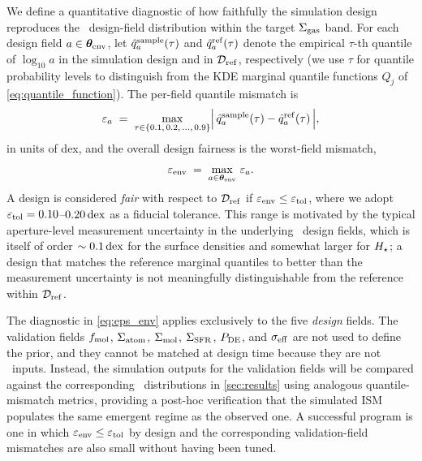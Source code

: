 We define a quantitative diagnostic of how faithfully the simulation
design reproduces the \PHANGS\ design-field distribution within the
target $\Sigma_{\rm gas}$ band. For each design field $a \in \boldsymbol{\theta}_{\rm env}$, let
$\hat{q}^{\rm sample}_{a}(\tau)$ and $\hat{q}^{\rm ref}_{a}(\tau)$
denote the empirical $\tau$-th quantile of $\log_{10} a$ in the
simulation design and in $\mathcal{D}_{\rm ref}$, respectively (we use $\tau$ for
quantile probability levels to distinguish from the KDE marginal
quantile functions $Q_j$ of \autoref{eq:quantile_function}).
The per-field quantile mismatch is
\begin{equation}
\varepsilon_a \;=\;
\max_{\tau \in \left\{{0.1,\,0.2,\,\ldots,\,0.9}\right\}}
\Bigl|\,\hat{q}^{\rm sample}_{a}(\tau)
- \hat{q}^{\rm ref}_{a}(\tau)\,\Bigr|,
\label{eq:eps_a}
\end{equation}
in units of dex, and the overall design fairness is the worst-field
mismatch,
\begin{equation}
\varepsilon_{\rm env} \;=\;
\max_{a \in \boldsymbol{\theta}_{\rm env}}\,\varepsilon_a.
\label{eq:eps_env}
\end{equation}
A design is considered \emph{fair} with respect to $\mathcal{D}_{\rm ref}$ if
$\varepsilon_{\rm env} \leq \varepsilon_{\rm tol}$, where we adopt
$\varepsilon_{\rm tol} = 0.10$--$0.20\,{\rm dex}$ as a fiducial tolerance.
This range is motivated by the typical aperture-level measurement
uncertainty in the underlying \PHANGS\ design fields, which is
itself of order $\sim 0.1\,{\rm dex}$ for the surface densities and somewhat
larger for $H_\star$; a design that matches the reference marginal
quantiles to better than the measurement uncertainty is not
meaningfully distinguishable from the reference within $\mathcal{D}_{\rm ref}$.

The diagnostic in \autoref{eq:eps_env} applies exclusively to the
five \emph{design} fields. The validation fields $f_{\rm mol}$, $\Sigma_{\rm atom}$,
$\Sigma_{\rm mol}$, $\Sigma_{\rm SFR}$, $P_{\rm DE}$, and $\sigma_{\rm eff}$ are not used to define the
prior, and they cannot be matched at design time because they are
not \TIGRESS\ inputs. Instead, the simulation outputs for the
validation fields will be compared against the corresponding
\PHANGS\ distributions in \autoref{sec:results} using analogous
quantile-mismatch metrics, providing a post-hoc verification that
the simulated ISM populates the same emergent regime as the
observed one. A successful program is one in which
$\varepsilon_{\rm env} \leq \varepsilon_{\rm tol}$ by design and the
corresponding validation-field mismatches are also small without
having been tuned.

